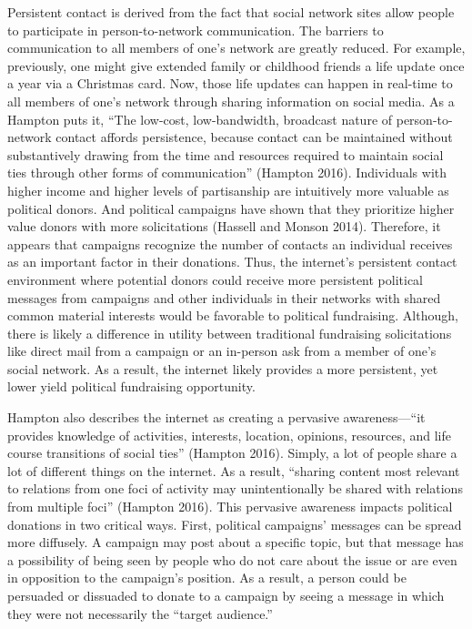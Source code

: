 \documentclass[12pt,]{article}
\begin{document}
Persistent contact is derived from the fact that social network sites
allow people to participate in person-to-network communication. The
barriers to communication to all members of one's network are greatly
reduced. For example, previously, one might give extended family or
childhood friends a life update once a year via a Christmas card. Now,
those life updates can happen in real-time to all members of one's
network through sharing information on social media. As a Hampton puts
it, ``The low-cost, low-bandwidth, broadcast nature of person-to-network
contact affords persistence, because contact can be maintained without
substantively drawing from the time and resources required to maintain
social ties through other forms of communication'' (Hampton 2016).
Individuals with higher income and higher levels of partisanship are
intuitively more valuable as political donors. And political campaigns
have shown that they prioritize higher value donors with more
solicitations (Hassell and Monson 2014). Therefore, it appears that
campaigns recognize the number of contacts an individual receives as an
important factor in their donations. Thus, the internet's persistent
contact environment where potential donors could receive more persistent
political messages from campaigns and other individuals in their
networks with shared common material interests would be favorable to
political fundraising. Although, there is likely a difference in utility
between traditional fundraising solicitations like direct mail from a
campaign or an in-person ask from a member of one's social network. As a
result, the internet likely provides a more persistent, yet lower yield
political fundraising opportunity.

Hampton also describes the internet as creating a pervasive
awareness---``it provides knowledge of activities, interests, location,
opinions, resources, and life course transitions of social ties''
(Hampton 2016). Simply, a lot of people share a lot of different things
on the internet. As a result, ``sharing content most relevant to
relations from one foci of activity may unintentionally be shared with
relations from multiple foci'' (Hampton 2016). This pervasive awareness
impacts political donations in two critical ways. First, political
campaigns' messages can be spread more diffusely. A campaign may post
about a specific topic, but that message has a possibility of being seen
by people who do not care about the issue or are even in opposition to
the campaign's position. As a result, a person could be persuaded or
dissuaded to donate to a campaign by seeing a message in which they were
not necessarily the ``target audience.''
\end{document}
